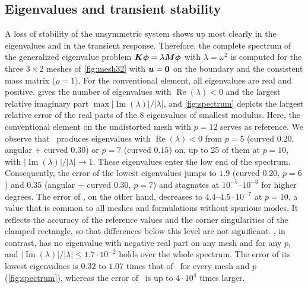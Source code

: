 \subsection{Eigenvalues and transient stability}
\label{sec:num-spectra}
%
A loss of stability of the unsymmetric system shows up most clearly in the eigenvalues and in the transient response. Therefore, the complete spectrum of the generalized eigenvalue problem $\bm{K}\bm\phi=\lambda\bm{M}\bm\phi$ with $\lambda=\omega^2$ is computed for the three $3\times2$ meshes of \cref{fig:mesh32} with $\bm{u}=\bm{0}$ on the boundary and the consistent mass matrix ($\rho=1$). For the conventional element, all eigenvalues are real and positive.  gives the number of eigenvalues with $\operatorname{Re}(\lambda)<0$ and the largest relative imaginary part $\max|\operatorname{Im}(\lambda)|/|\lambda|$, and \cref{fig:spectrum} depicts the largest relative error of the real parts of the 8 eigenvalues of smallest modulus. Here, the conventional element on the undistorted mesh with $p=12$ serves as reference. We observe that \PM\ produces eigenvalues with $\operatorname{Re}(\lambda)<0$ from $p=5$ (curved $0.20$, angular + curved $0.30$) or $p=7$ (curved $0.15$) on, up to 25 of them at $p=10$, with $|\operatorname{Im}(\lambda)|/|\lambda|\to1$. These eigenvalues enter the low end of the spectrum. Consequently, the error of the lowest eigenvalues jumps to $1.9$ (curved $0.20$, $p=6$) and $0.35$ (angular + curved $0.30$, $p=7$) and stagnates at $10^{-5}$--$10^{-3}$ for higher degrees. The error of \PP, on the other hand, decreases to $4.4$--$4.5\cdot10^{-7}$ at $p=10$, a value that is common to all meshes and formulations without spurious modes. It reflects the accuracy of the reference values and the corner singularities of the clamped rectangle, so that differences below this level are not significant. \PH, in contrast, has no eigenvalue with negative real part on any mesh and for any $p$, and $|\operatorname{Im}(\lambda)|/|\lambda|\le1.7\cdot10^{-2}$ holds over the whole spectrum. The error of its lowest eigenvalues is $0.32$ to $1.07$ times that of \PP\ for every mesh and $p$ (\cref{fig:spectrum}), whereas the error of \PM\ is up to $4\cdot10^{4}$ times larger.

\begin{table}[htbp]
  \centering\small
  \caption{Spectrum of $(\matr K,\matr M)$ on the distorted $3\times2$ meshes: number of eigenvalues with $\operatorname{Re}(\lambda)<0$ / $\max|\operatorname{Im}(\lambda)|/|\lambda|$. \PP\ has a real positive spectrum in all cases.}
  \label{tab:spectrum}
  
\end{table}

